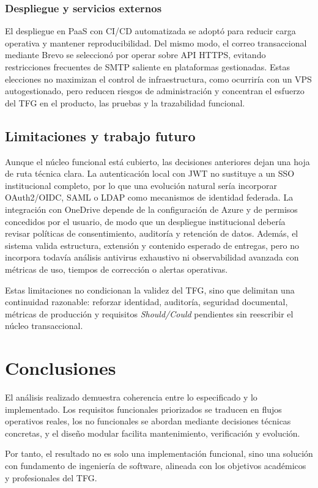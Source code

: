 \subsubsection*{Despliegue y servicios externos}

El despliegue en PaaS con CI/CD automatizada se adopt\'o para reducir carga operativa y mantener reproducibilidad. Del mismo modo, el correo transaccional mediante Brevo se seleccion\'o por operar sobre API HTTPS, evitando restricciones frecuentes de SMTP saliente en plataformas gestionadas. Estas elecciones no maximizan el control de infraestructura, como ocurrir\'ia con un VPS autogestionado, pero reducen riesgos de administraci\'on y concentran el esfuerzo del TFG en el producto, las pruebas y la trazabilidad funcional.

\subsection{Limitaciones y trabajo futuro}

Aunque el n\'ucleo funcional est\'a cubierto, las decisiones anteriores dejan una hoja de ruta t\'ecnica clara. La autenticaci\'on local con JWT no sustituye a un SSO institucional completo, por lo que una evoluci\'on natural ser\'ia incorporar OAuth2/OIDC, SAML o LDAP como mecanismos de identidad federada. La integraci\'on con OneDrive depende de la configuraci\'on de Azure y de permisos concedidos por el usuario, de modo que un despliegue institucional deber\'ia revisar pol\'iticas de consentimiento, auditor\'ia y retenci\'on de datos. Adem\'as, el sistema valida estructura, extensi\'on y contenido esperado de entregas, pero no incorpora todav\'ia an\'alisis antivirus exhaustivo ni observabilidad avanzada con m\'etricas de uso, tiempos de correcci\'on o alertas operativas.

Estas limitaciones no condicionan la validez del TFG, sino que delimitan una continuidad razonable: reforzar identidad, auditor\'ia, seguridad documental, m\'etricas de producci\'on y requisitos \emph{Should/Could} pendientes sin reescribir el n\'ucleo transaccional.

\FloatBarrier
\section{Conclusiones}

El an\'alisis realizado demuestra coherencia entre lo especificado y lo implementado.
Los requisitos funcionales priorizados se traducen en flujos operativos reales,
los no funcionales se abordan mediante decisiones t\'ecnicas concretas,
y el dise\~no modular facilita mantenimiento, verificaci\'on y evoluci\'on.

Por tanto, el resultado no es solo una implementaci\'on funcional,
sino una soluci\'on con fundamento de ingenier\'ia de software,
alineada con los objetivos acad\'emicos y profesionales del TFG.
